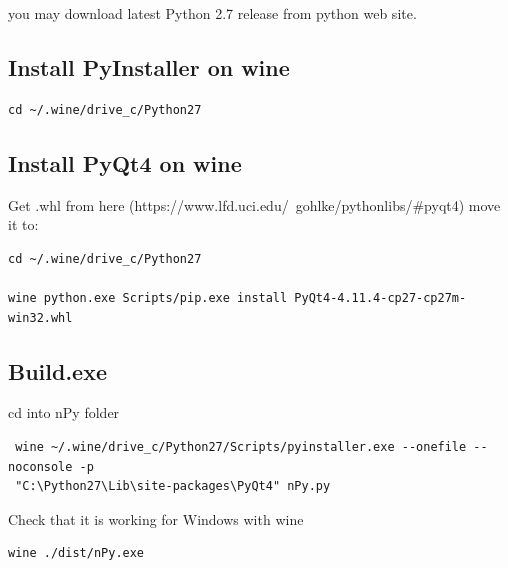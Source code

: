 \documentclass[a4paper,10pt]{article}
\begin{document}
\noindent you may download latest Python 2.7 release from python web site.

\subsection{Install PyInstaller on wine}
\begin{verbatim}
cd ~/.wine/drive_c/Python27 
\end{verbatim}

\subsection{Install PyQt4 on wine}

\noindent Get .whl from here (https://www.lfd.uci.edu/~gohlke/pythonlibs/\#pyqt4) move it to: 
\begin{verbatim}
cd ~/.wine/drive_c/Python27

wine python.exe Scripts/pip.exe install PyQt4-4.11.4-cp27-cp27m-win32.whl
\end{verbatim}

\subsection{Build.exe}
\noindent cd into nPy folder 

\begin{verbatim}
 wine ~/.wine/drive_c/Python27/Scripts/pyinstaller.exe --onefile --noconsole -p 
 "C:\Python27\Lib\site-packages\PyQt4" nPy.py
\end{verbatim}

\noindent Check that it is working for Windows with wine
\begin{verbatim}
wine ./dist/nPy.exe
\end{verbatim}
\end{document}
